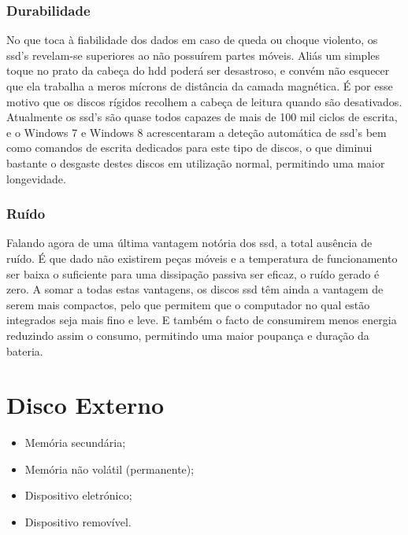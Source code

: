\documentclass[a4paper]{report}
\begin{document}
\newpage

\subsubsection*{Durabilidade}

No que toca à fiabilidade dos dados em caso de queda ou choque violento, os \ac{ssd}’s revelam-se superiores ao não possuírem partes móveis. Aliás um simples toque no prato da cabeça do \ac{hdd} poderá ser desastroso, e convém não esquecer que ela trabalha a meros mícrons de distância da camada magnética. É por esse motivo que os discos rígidos recolhem a cabeça de leitura quando são desativados.
Atualmente os \ac{ssd}’s são quase todos capazes de mais de 100 mil ciclos de escrita, e o Windows 7 e Windows 8 acrescentaram a deteção automática de \ac{ssd}’s bem como comandos de escrita dedicados para este tipo de discos, o que diminui bastante o desgaste destes discos em utilização normal, permitindo uma maior longevidade.

\subsubsection*{Ruído}

Falando agora de uma última vantagem notória dos \ac{ssd}, a total ausência de ruído. É que dado não existirem peças móveis e a temperatura de funcionamento ser baixa o suficiente para uma dissipação passiva ser eficaz, o ruído gerado é zero.
A somar a todas estas vantagens, os discos \ac{ssd} têm ainda a vantagem de serem mais compactos, pelo que permitem que o computador no qual estão integrados seja mais fino e leve. E também o facto de consumirem menos energia reduzindo assim o consumo, permitindo uma maior poupança e duração da bateria.

\newpage

\section{Disco Externo}
\label{sect.externo}

\begin{itemize}
\item Memória secundária;
\item Memória não volátil (permanente);
\item Dispositivo eletrónico;
\item Dispositivo removível.
\end{itemize}
\end{document}
